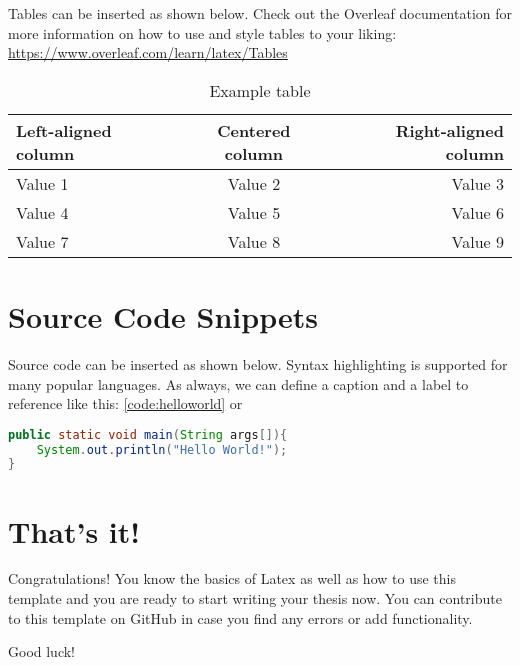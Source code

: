Tables can be inserted as shown below. Check out the Overleaf documentation for more information on how to use and style tables to your liking: \url{https://www.overleaf.com/learn/latex/Tables}

\begin{table}[ht]   %
    \centering
    \footnotesize
    \begin{tabular}{lcr} %
        \toprule    %
        Left-aligned column  & Centered column  & Right-aligned column \\
        \midrule    %
        Value 1 & Value 2 & Value 3 \\
        Value 4 & Value 5 & Value 6 \\
        Value 7 & Value 8 & Value 9 \\
        \bottomrule %
    \end{tabular}
    \caption{Example table}
    \label{table:example_table}
\end{table}


\section{Source Code Snippets}
Source code can be inserted as shown below. Syntax highlighting is supported for many popular languages. As always, we can define a caption and a label to reference like this: \cref{code:helloworld} or 

\begin{lstlisting}[language=Java, caption=Hello World in Java, label=code:helloworld]
public static void main(String args[]){
    System.out.println("Hello World!");
}
\end{lstlisting}


\section{That's it!}
Congratulations! You know the basics of Latex as well as how to use this template and you are ready to start writing your thesis now. You can contribute to this template on GitHub in case you find any errors or add functionality.\par

Good luck!